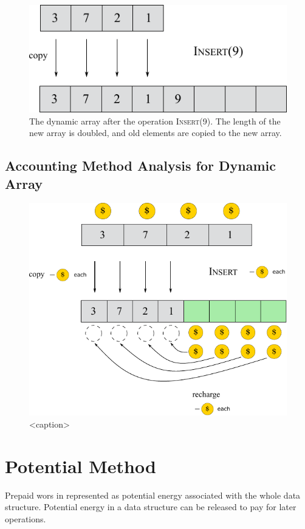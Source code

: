 \begin{figure}[htbp]
    \includegraphics[width=0.4\linewidth]{figures/dynamic_arr_append.pdf}

    \hfill

    \caption[width=0.5\linewidth]{The dynamic array after the operation \textsc{Insert}(9). The length of the new array is doubled, and old elements are copied to the new array.}
\end{figure}

\subsection{Accounting Method Analysis for Dynamic Array}

\begin{figure}[htbp]
    \centering
    \includegraphics[width=0.6\linewidth]{figures/accounting_method_insert.pdf}
    \caption{<caption>}
\end{figure}

\section{Potential Method}

\vspace{\parskip}

Prepaid wors in represented as potential energy associated with the whole data structure. Potential energy in a data structure can be released to pay for later operations.

